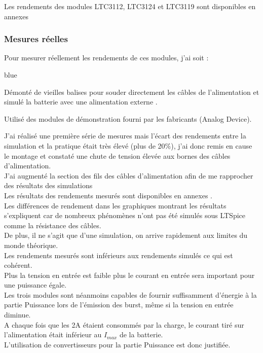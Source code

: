 Les rendements des modules LTC3112, LTC3124 et LTC3119 sont disponibles en annexes 


\subsubsection{Mesures réelles}
Pour mesurer réellement les rendements de ces modules, j'ai soit : 

\begin{items}{blue}{\Triangle}
    \item Démonté de vieilles balises pour souder directement les câbles de l'alimentation et simulé la batterie avec une alimentation externe .
    \item Utilisé des modules de démonstration fourni par les fabricants (Analog Device).
\end{items}


J'ai réalisé une première série de mesures mais l'écart des rendements entre la simulation et la pratique était très élevé (plus de 20\%), j'ai donc remis en cause le montage et constaté une chute de tension élevée aux bornes des câbles d'alimentation.\\
J'ai augmenté la section des fils des câbles d'alimentation afin de me rapprocher des résultats des simulations\\

Les résultats des rendements mesurés sont disponibles en annexes .\\


Les différences de rendement dans les graphiques montrant les résultats s'expliquent car de nombreux phénomènes n'ont pas été simulés sous LTSpice comme la résistance des câbles.\\De plus, il ne s'agit que d'une simulation, on arrive rapidement aux limites du monde théorique.
\\Les rendements mesurés sont inférieurs aux rendements simulés ce qui est cohérent.\\
Plus la tension en entrée est faible plus le courant en entrée sera important pour une puissance égale.\\

Les trois modules sont néanmoins capables de fournir suffisamment d'énergie à la partie Puissance lors de l'émission des burst, même si la tension en entrée diminue.\\
A chaque fois que les 2A étaient consommés par la charge, le courant tiré sur l'alimentation était inférieur au $I_{max}$ de la batterie.\\ L'utilisation de convertisseurs pour la partie Puissance est donc justifiée.



